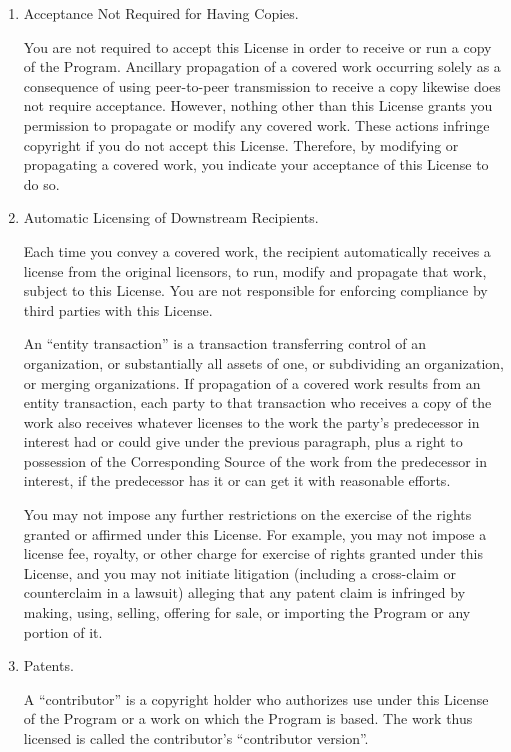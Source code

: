 \documentclass[11pt]{article}
\begin{document}
\begin{enumerate}
\item Acceptance Not Required for Having Copies.

You are not required to accept this License in order to receive or
run a copy of the Program.  Ancillary propagation of a covered work
occurring solely as a consequence of using peer-to-peer transmission
to receive a copy likewise does not require acceptance.  However,
nothing other than this License grants you permission to propagate or
modify any covered work.  These actions infringe copyright if you do
not accept this License.  Therefore, by modifying or propagating a
covered work, you indicate your acceptance of this License to do so.

\item Automatic Licensing of Downstream Recipients.

Each time you convey a covered work, the recipient automatically
receives a license from the original licensors, to run, modify and
propagate that work, subject to this License.  You are not responsible
for enforcing compliance by third parties with this License.

An ``entity transaction'' is a transaction transferring control of an
organization, or substantially all assets of one, or subdividing an
organization, or merging organizations.  If propagation of a covered
work results from an entity transaction, each party to that
transaction who receives a copy of the work also receives whatever
licenses to the work the party's predecessor in interest had or could
give under the previous paragraph, plus a right to possession of the
Corresponding Source of the work from the predecessor in interest, if
the predecessor has it or can get it with reasonable efforts.

You may not impose any further restrictions on the exercise of the
rights granted or affirmed under this License.  For example, you may
not impose a license fee, royalty, or other charge for exercise of
rights granted under this License, and you may not initiate litigation
(including a cross-claim or counterclaim in a lawsuit) alleging that
any patent claim is infringed by making, using, selling, offering for
sale, or importing the Program or any portion of it.

\item Patents.

A ``contributor'' is a copyright holder who authorizes use under this
License of the Program or a work on which the Program is based.  The
work thus licensed is called the contributor's ``contributor version''.


\end{enumerate}
\end{document}
